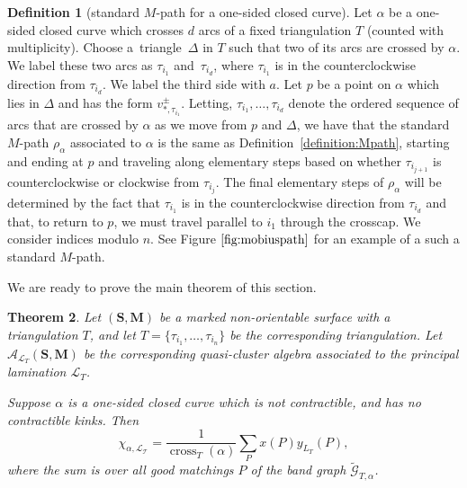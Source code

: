 \documentclass[10pt,a4paper]{amsart}
\numberwithin{equation}{section}
\newtheorem{Theorem}{Theorem}[section]
\theoremstyle{definition}
\newtheorem{Definition}[Theorem]{Definition}
\newcommand{\SM}{(\mathbf{S}, \mathbf{M})}
\begin{document}
\begin{Definition}[standard $M$-path for a one-sided closed curve]\label{definition:Mpath2}
Let $\alpha$ be a one-sided closed curve which crosses $d$ arcs of a fixed triangulation $T$ (counted with multiplicity). Choose a~triangle~$\Delta$ in $T$ such that two of its arcs are crossed by $\alpha$. We label these two arcs as $\tau_{i_1}$ and~$\tau_{i_d}$, where $\tau_{i_1}$ is in the counterclockwise direction from $\tau_{i_d}$. We label the third side with $a$. Let $p$ be a point on $\alpha$ which lies in $\Delta$ and has the form $v_{*, \tau_{i_1}}^{\pm}$. Letting, $\tau_{i_1},\ldots, \tau_{i_d}$ denote the ordered sequence of arcs that are crossed by $\alpha$ as we move from $p$ and $\Delta$, we have that the standard $M$-path $\rho_{\alpha}$ associated to $\alpha$ is the same as Definition~\ref{definition:Mpath}, starting and ending at $p$ and traveling along elementary steps based on whether $\tau_{i_{j+1}}$ is counterclockwise or clockwise from $\tau_{i_j}$. The final elementary steps of $\rho_{\alpha}$ will be determined by the fact that $\tau_{i_1}$ is in the counterclockwise direction from $\tau_{i_d}$ and that, to return to $p$, we must travel parallel to $i_1$ through the crosscap. We consider indices modulo $n$. See Figure $\ref{fig:mobiuspath}$ for an example of a such a standard $M$-path.
\end{Definition}

We are ready to prove the main theorem of this section.


\begin{Theorem}\label{thm:matrixformula}
Let $\SM$ be a marked non-orientable surface with a triangulation $T$, and let $T=\{\tau_{i_1}, \ldots, \tau_{i_n}\}$ be the corresponding triangulation. Let $\mathcal{A}_{\mathcal{L}_T}\SM$ be the corresponding quasi-cluster algebra associated to the principal lamination $\mathcal{L}_T$.

Suppose $\alpha$ is a one-sided closed curve which is not contractible, and has no contractible kinks. Then{\samepage \[\displaystyle\chi_{\alpha, \mathcal{L_T}}=\frac{1}{\operatorname{cross}_T(\alpha)}\sum_{P}x(P)y_{L_T}(P),\] where the sum is over all good matchings $P$ of the band graph $\widetilde{\mathcal{G}}_{T, \alpha}$.}
\end{Theorem}
\end{document}
